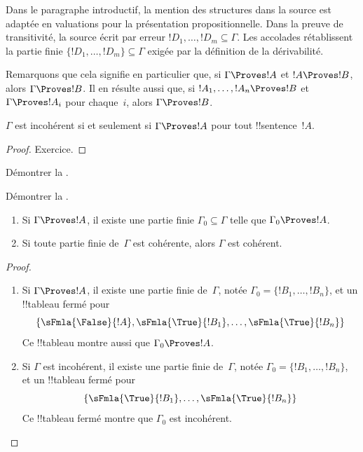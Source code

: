 \documentclass[11pt,a4paper,openany]{memoir}
\begin{document}
\begin{editorial}
Dans le paragraphe introductif, la mention des structures dans la
source est adaptée en valuations pour la présentation propositionnelle.
Dans la preuve de transitivité, la source écrit par erreur
$!D_1, \dots, !D_m \subseteq \Gamma$. Les accolades rétablissent la
partie finie $\{!D_1, \dots, !D_m\} \subseteq \Gamma$ exigée par la
définition de la dérivabilité.
\end{editorial}

Remarquons que cela signifie en particulier que, si
$\Gamma \Proves !A$ et $!A \Proves !B$, alors $\Gamma \Proves !B$.
Il en résulte aussi que, si $!A_1, \dots, !A_n \Proves !B$ et
$\Gamma \Proves !A_i$ pour chaque~$i$, alors $\Gamma \Proves !B$.

\begin{prop}
$\Gamma$ est incohérent si et seulement si $\Gamma \Proves !A$
pour tout !!{sentence}~$!A$.
\end{prop}

\begin{proof}
Exercice.
\end{proof}

\begin{prob}
Démontrer la .
\end{prob}
\tagendprob

\begin{prob}
Démontrer la .
\end{prob}
\tagendprob

\begin{prop}[Compacité]
  \begin{enumerate}
  \item Si $\Gamma \Proves !A$, il existe une partie finie $\Gamma_0
    \subseteq \Gamma$ telle que $\Gamma_0 \Proves !A$.
  \item Si toute partie finie de~$\Gamma$ est cohérente,
    alors $\Gamma$ est cohérent.
  \end{enumerate}
\end{prop}

\begin{proof}
  \begin{enumerate}
    \item Si $\Gamma \Proves !A$, il existe une partie finie
      de~$\Gamma$, notée
      $\Gamma_0 = \{!B_1, \dots, !B_n\}$, et un !!{tableau} fermé pour
      \[
      \{\sFmla{\False}{!A}, \sFmla{\True}{!B_1}, \dots, \sFmla{\True}{!B_n}\}
      \]
      Ce !!{tableau} montre aussi que $\Gamma_0 \Proves !A$.
    \item Si $\Gamma$ est incohérent, il existe une partie finie
      de~$\Gamma$, notée
      $\Gamma_0 = \{!B_1, \dots, !B_n\}$, et un !!{tableau} fermé pour
      \[
      \{\sFmla{\True}{!B_1}, \dots, \sFmla{\True}{!B_n}\}
      \]
      Ce !!{tableau} fermé montre que $\Gamma_0$ est incohérent.
  \end{enumerate}
\end{proof}
\end{document}
